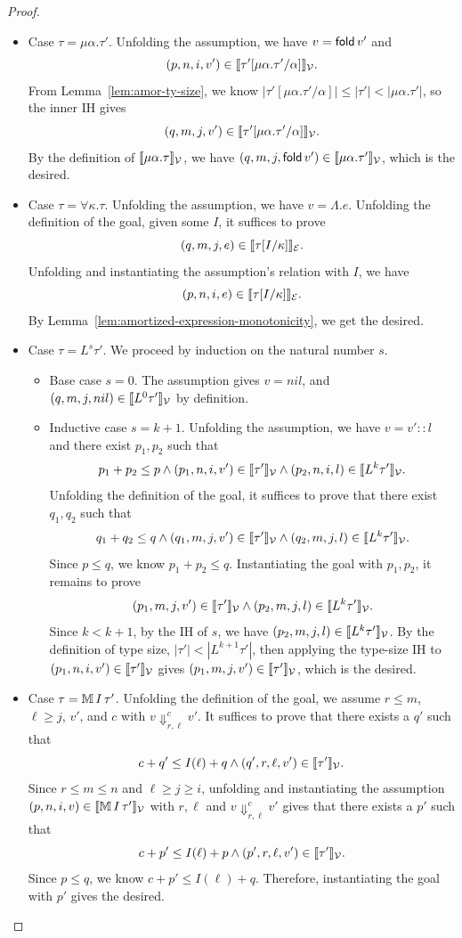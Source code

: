 \begin{proof}
\begin{itemize}
\item Case $\tau = \mu\alpha.\tau'$.
Unfolding the assumption, we have $v=\mathsf{fold}\, v'$ and 
\[
  (p, n,i,v')\in
  \llbracket \tau'[\mu\alpha.\tau'/\alpha] \rrbracket_{\mathcal{V}}.
\]
From Lemma~\ref{lem:amor-ty-size}, we know $|\tau'[\mu\alpha.\tau'/\alpha]|\leq |\tau'| < |\mu\alpha.\tau'|$, so the inner IH gives
\[
  (q, m,j,v')\in
  \llbracket \tau'[\mu\alpha.\tau'/\alpha] \rrbracket_{\mathcal{V}}.
\]
By the definition of $\llbracket \mu\alpha.\tau \rrbracket_{\mathcal{V}}$, we have 
$(q, m,j,\mathsf{fold}\, v')\in\llbracket \mu\alpha.\tau' \rrbracket_{\mathcal{V}}$, which is the desired.

\item Case $\tau = \forall\kappa.\tau$.
Unfolding the assumption, we have $v = \Lambda.e$.
Unfolding the definition of the goal, given some $I$, it suffices to prove
\[(q, m,j,e) \in \llbracket \tau[I/\kappa] \rrbracket_{\mathcal{E}}.\]
Unfolding and instantiating the assumption's relation with $I$, we have 
\[(p, n,i,e) \in \llbracket \tau[I/\kappa] \rrbracket_{\mathcal{E}}.\]
By Lemma~\ref{lem:amortized-expression-monotonicity}, we get the desired.

\item Case $\tau = L^s \tau'$.
We proceed by induction on the natural number $s$.

\begin{itemize}
\item {Base case $s=0$.}
The assumption gives $v=nil$, and $(q,m,j,nil)\in\llbracket L^0\tau' \rrbracket_{\mathcal{V}}$ by definition.

\item {Inductive case $s=k+1$.}
Unfolding the assumption, we have $v=v'::l$ and there exist $p_1, p_2$ such that
\[
  p_1 + p_2 \leq p \land
  (p_1, n, i, v') \in \llbracket \tau' \rrbracket_{\mathcal{V}} \land
  (p_2, n, i, l) \in \llbracket L^k\tau' \rrbracket_{\mathcal{V}}.
\]
Unfolding the definition of the goal, it suffices to prove that there exist $q_1, q_2$ such that
\[
  q_1 + q_2 \leq q \land
  (q_1,m, j, v') \in \llbracket \tau' \rrbracket_{\mathcal{V}} \land
  (q_2,m, j, l) \in \llbracket L^k\tau' \rrbracket_{\mathcal{V}}.
\]
Since $p \leq q$, we know $p_1 + p_2 \leq q$. Instantiating the goal with $p_1, p_2$, it remains to prove
\[(p_1,m, j, v') \in \llbracket \tau' \rrbracket_{\mathcal{V}} \land (p_2,m, j, l) \in \llbracket L^k\tau' \rrbracket_{\mathcal{V}}.\]
Since $k < k+1$, by the IH of $s$, we have $(p_2,m, j, l) \in \llbracket L^k\tau' \rrbracket_{\mathcal{V}}$.
By the definition of type size, $|\tau'|<|L^{k+1}\tau'|$, then applying the type-size IH to $(p_1, n, i, v')\in\llbracket \tau' \rrbracket_{\mathcal{V}}$ gives
$(p_1, m, j, v')\in\llbracket \tau' \rrbracket_{\mathcal{V}}$, which is the desired.
\end{itemize}

\item Case $\tau = \mathbb{M}\,{I}\, \tau'$.
Unfolding the definition of the goal, we assume $r \leq m$, $\ell \geq j$, $v'$, and $c$
with $v\Downarrow^c_{r,\ell}v'$. It suffices to prove that there exists a $q'$ such that
\[c+q' \leq I(\ell)+q \land (q',r, \ell, v') \in \llbracket \tau' \rrbracket_{\mathcal{V}}.\]
Since $r\leq m\leq n$ and $\ell\geq j\geq i$, unfolding and instantiating the assumption $(p, n, i, v) \in 
\llbracket \mathbb{M}\,{ I}\, \tau' \rrbracket_{\mathcal{V}}$ with $r, \ell$ and $v\Downarrow^c_{r,\ell}v'$ gives that there exists a $p'$ such that
\[c+p' \leq I(\ell)+p \land (p',r, \ell, v') \in \llbracket \tau' \rrbracket_{\mathcal{V}}.\]
Since $p \leq q$, we know $c+p' \leq I(\ell) + q$. Therefore, instantiating the goal with $p'$ gives the desired.
\end{itemize}
\end{proof}

